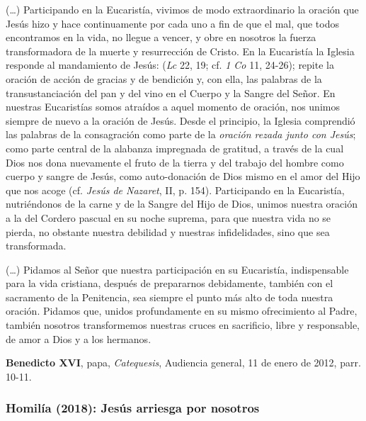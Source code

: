 \label{b-05-01-2015H}

\begin{patercite}
(\ldots) Participando en la Eucaristía, vivimos de modo extraordinario la oración que Jesús hizo y hace continuamente por cada uno a fin de que el mal, que todos encontramos en la vida, no llegue a vencer, y obre en nosotros la fuerza transformadora de la muerte y resurrección de Cristo. En la Eucaristía la Iglesia responde al mandamiento de Jesús:  (\emph{Lc} 22, 19; cf. \emph{1 Co} 11, 24-26); repite la oración de acción de gracias y de bendición y, con ella, las palabras de la transustanciación del pan y del vino en el Cuerpo y la Sangre del Señor. En nuestras Eucaristías somos atraídos a aquel momento de oración, nos unimos siempre de nuevo a la oración de Jesús. Desde el principio, la Iglesia comprendió las palabras de la consagración como parte de la \emph{oración rezada junto con Jesús}; como parte central de la alabanza impregnada de gratitud, a través de la cual Dios nos dona nuevamente el fruto de la tierra y del trabajo del hombre como cuerpo y sangre de Jesús, como auto-donación de Dios mismo en el amor del Hijo que nos acoge (cf. \emph{Jesús de Nazaret}, II, p. 154). Participando en la Eucaristía, nutriéndonos de la carne y de la Sangre del Hijo de Dios, unimos nuestra oración a la del Cordero pascual en su noche suprema, para que nuestra vida no se pierda, no obstante nuestra debilidad y nuestras infidelidades, sino que sea transformada.

(\ldots) Pidamos al Señor que nuestra participación en su Eucaristía, indispensable para la vida cristiana, después de prepararnos debidamente, también con el sacramento de la Penitencia, sea siempre el punto más alto de toda nuestra oración. Pidamos que, unidos profundamente en su mismo ofrecimiento al Padre, también nosotros transformemos nuestras cruces en sacrificio, libre y responsable, de amor a Dios y a los hermanos.

\textbf{Benedicto XVI}, papa, \textit{Catequesis}, Audiencia general, 11 de enero de 2012, parr. 10-11.
\end{patercite}

\newpage
\subsubsection{Homilía (2018): Jesús arriesga por nosotros}


